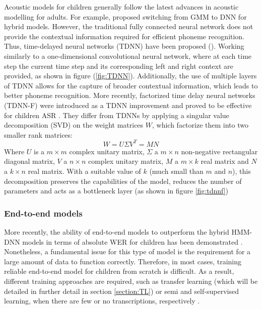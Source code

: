 Acoustic models for children generally follow the latest advances in acoustic modelling for adults. For example, \cite{TFchildren}  proposed switching from GMM to DNN for hybrid models. However, the traditional fully connected neural network does not provide the contextual information required for efficient phoneme recognition. Thus, time-delayed neural networks (TDNN) have been proposed (\cite{tdnn}). Working similarly to a one-dimensional convolutional neural network, where at each time step the current time step and its corresponding left and right context are provided, as shown in figure (\ref{fig:TDNN}). Additionally, the use of multiple layers of TDNN allows for the capture of broader contextual information, which leads to better phoneme recognition.
More recently, factorized time delay neural networks (TDNN-F) were introduced as a TDNN improvement \cite{TDNN-F} and proved to be effective for children ASR \cite{tdnnf-children}. They differ from TDNNs by applying a singular value decomposition (SVD) on the weight matrices $W$, which factorize them into two smaller rank matrices:
\begin{equation}
    W = U\Sigma V^T = MN
\end{equation}
Where $U$ is a  $m \times m$ complex unitary matrix, $\Sigma$ a  ${m\times n}$ non-negative rectangular diagonal matrix, $V$ a $n \times n$ complex unitary matrix, $M$ a $m \times k$ real matrix and $N$ a $k \times n$ real matrix.
With a suitable value of $k$ (much small than $m$ and $n$), this decomposition preserves the capabilities of the model, reduces the number of parameters and acts as a bottleneck layer (as shown in figure \ref{fig:tdnnf})

\subsubsection{End-to-end models}
More recently, the ability of end-to-end models to outperform the hybrid HMM-DNN models in terms of absolute WER for children has been demonstrated \cite{gelin2021endtoend,sri_end2end,chen2020data,ng2020cuhk}. Nonetheless, a fundamental issue for this type of model is the requirement for a large amount of data to function correctly. Therefore, in most cases, training reliable end-to-end model for children from scratch is difficult. As a result, different training approaches are required, such as transfer learning (which will be detailed in further detail in section \ref{section:TL}) or semi and self-supervised learning, when there are few or no transcriptions, respectively \cite{xu21c_interspeech}.

